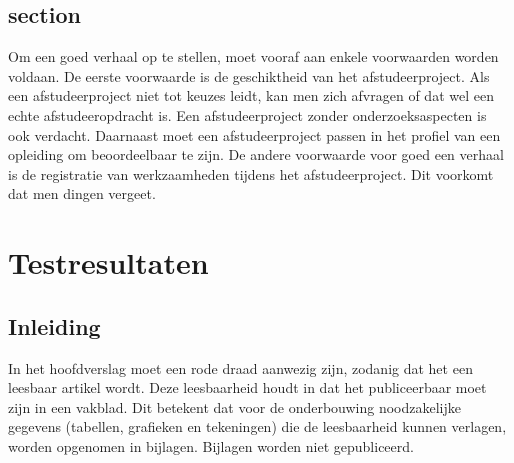 		\section{section}
		
		Om een goed verhaal op te stellen, moet vooraf aan enkele voorwaarden
		worden voldaan. De eerste voorwaarde is de geschiktheid van het
		afstudeerproject. Als een afstudeerproject niet tot keuzes leidt, kan
		men zich afvragen of dat wel een echte afstudeeropdracht is. Een
		afstudeerproject zonder onderzoeksaspecten is ook verdacht. Daarnaast
		moet een afstudeerproject passen in het profiel van een opleiding om
		beoordeelbaar te zijn. De andere voorwaarde voor goed een verhaal is
		de registratie van werkzaamheden tijdens het afstudeerproject. Dit
		voorkomt dat men dingen vergeet.
		
		
		\chapter{Testresultaten}
		
		\section{Inleiding}
		In het hoofdverslag moet een rode draad aanwezig zijn,
		zodanig dat het een leesbaar artikel wordt. Deze leesbaarheid houdt in
		dat het publiceerbaar moet zijn in een vakblad. Dit betekent dat voor
		de onderbouwing noodzakelijke gegevens (tabellen, grafieken en
		tekeningen) die de leesbaarheid kunnen verlagen, worden opgenomen in
		bijlagen. Bijlagen worden niet gepubliceerd.
		
		
		
			
